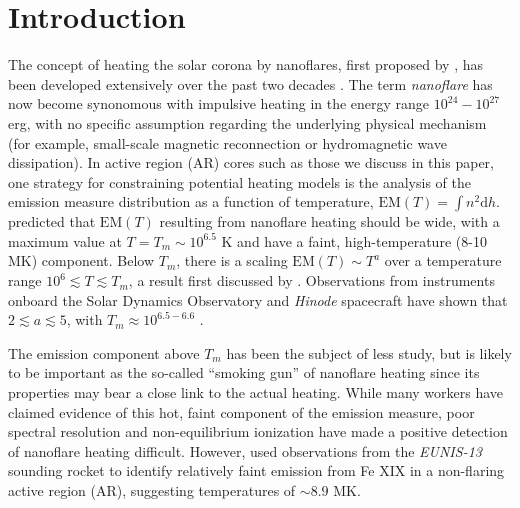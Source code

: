 \documentclass[preprint,linenumbers]{aastex}
\begin{document}
	\section{Introduction}
	\label{sec:intro}
	\par The concept of heating the solar corona by nanoflares, first proposed by \citet{parker_nanoflares_1988}, has been developed extensively over the past two decades \citep[e.g.][]{cargill_implications_1994,cargill_nanoflare_2004,klimchuk_solving_2006}. The term \textit{nanoflare} has now become synonomous with impulsive heating in the energy range $10^{24}-10^{27}$ erg, with no specific assumption regarding the underlying physical mechanism (for example, small-scale magnetic reconnection or hydromagnetic wave dissipation).
	In active region (AR) cores such as those we discuss in this paper, one strategy for constraining potential heating models is the analysis of the emission measure distribution as a function of temperature, $\mathrm{EM}(T)=\int n^2\mathrm{d}h$. \citet{cargill_implications_1994,cargill_nanoflare_2004} predicted that $\mathrm{EM}(T)$ resulting from nanoflare heating should be wide, with a maximum value at $T=T_m\sim10^{6.5}$ K and have a faint, high-temperature (8-10 MK) component. Below $T_m$, there is a scaling $\mathrm{EM}(T)\sim T^a$ over a temperature range $10^6\lesssim T\lesssim T_m$, a result first discussed by \citet{jordan_structure_1975}. Observations from instruments onboard the Solar Dynamics Observatory \citep[SDO,][]{pesnell_solar_2012} and \textit{Hinode} spacecraft \citep{kosugi_hinode_2007} have shown that $2\lesssim a\lesssim5$, with $T_m\approx10^{6.5-6.6}$ \citep{warren_constraints_2011,warren_systematic_2012,winebarger_using_2011,tripathi_emission_2011,schmelz_cold_2012,del_zanna_evolution_2015}.
	\par The emission component above $T_m$ has been the subject of less study, but is likely to be important as the so-called ``smoking gun'' of nanoflare heating since its properties may bear a close link to the actual heating. While many workers \citep{reale_evidence_2009,schmelz_hinode_2009,miceli_x-ray_2012,testa_hinode/eis_2012,del_zanna_elemental_2014,petralia_thermal_2014,schmelz_hot_2015} have claimed evidence of this hot, faint component of the emission measure, poor spectral resolution \citep{testa_temperature_2011,winebarger_defining_2012} and non-equilibrium ionization \citep{bradshaw_explosive_2006,reale_nonequilibrium_2008} have made a positive detection of nanoflare heating difficult. However, \citet{brosius_pervasive_2014} used observations from the \textit{EUNIS-13} sounding rocket to identify relatively faint emission from Fe XIX in a non-flaring active region (AR), suggesting temperatures of $\sim8.9$ MK.
\end{document}
